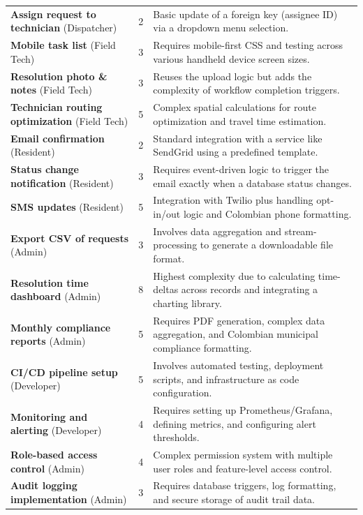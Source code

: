 \documentclass[12pt,a4paper]{article}
\begin{document}
\begin{longtable}{|p{}|c|p{}|}
\textbf{Assign request to technician} (Dispatcher) & 2 & Basic update of a foreign key (assignee ID) via a dropdown menu selection. \\
\textbf{Mobile task list} (Field Tech) & 3 & Requires mobile-first CSS and testing across various handheld device screen sizes. \\
\textbf{Resolution photo \& notes} (Field Tech) & 3 & Reuses the upload logic but adds the complexity of workflow completion triggers. \\
\textbf{Technician routing optimization} (Field Tech) & 5 & Complex spatial calculations for route optimization and travel time estimation. \\
\textbf{Email confirmation} (Resident) & 2 & Standard integration with a service like SendGrid using a predefined template. \\
\textbf{Status change notification} (Resident) & 3 & Requires event-driven logic to trigger the email exactly when a database status changes. \\
\textbf{SMS updates} (Resident) & 5 & Integration with Twilio plus handling opt-in/out logic and Colombian phone formatting. \\
\textbf{Export CSV of requests} (Admin) & 3 & Involves data aggregation and stream-processing to generate a downloadable file format. \\
\textbf{Resolution time dashboard} (Admin) & 8 & Highest complexity due to calculating time-deltas across records and integrating a charting library. \\
\textbf{Monthly compliance reports} (Admin) & 5 & Requires PDF generation, complex data aggregation, and Colombian municipal compliance formatting. \\
\textbf{CI/CD pipeline setup} (Developer) & 5 & Involves automated testing, deployment scripts, and infrastructure as code configuration. \\
\textbf{Monitoring and alerting} (Developer) & 4 & Requires setting up Prometheus/Grafana, defining metrics, and configuring alert thresholds. \\
\textbf{Role-based access control} (Admin) & 4 & Complex permission system with multiple user roles and feature-level access control. \\
\textbf{Audit logging implementation} (Admin) & 3 & Requires database triggers, log formatting, and secure storage of audit trail data. \\
\end{longtable}
\end{document}
